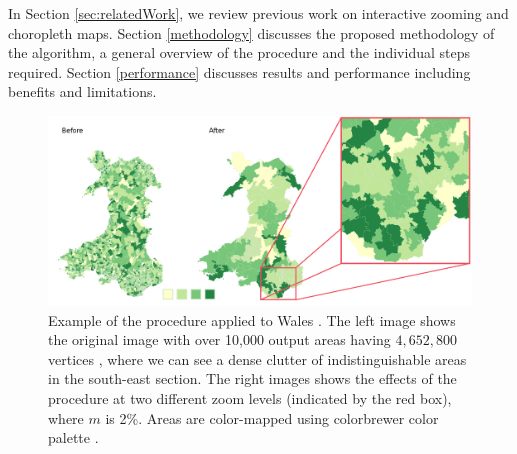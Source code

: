 In Section \ref{sec:relatedWork}, we review previous work on interactive zooming and choropleth maps. Section \ref{methodology} discusses the proposed methodology of the algorithm, a general overview of the procedure and the individual steps required. Section \ref{performance} discusses results and performance including benefits and limitations. 

\begin{figure}[t]
\centering
\includegraphics[width=1\linewidth]{images/Zooming3}
\caption{Example of the procedure applied to Wales \cite{wales}. The left image shows the original image with over 10,000 output areas having $4,652,800$ vertices \cite{vickers2007creating}, where we can see a dense clutter of indistinguishable areas in the south-east section. The right images shows the effects of the procedure at two different zoom levels (indicated by the red box), where $m$ is 2\%. Areas are color-mapped using colorbrewer color palette \cite{colorbrewer}. } \label{fig:zoomingExample} \vspace{0.2cm}
\end{figure}


